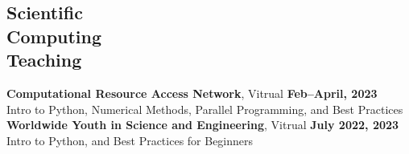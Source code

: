 \documentclass[margin,line]{resume}
\begin{document}
\begin{resume}

    \section{\mysidestyle Scientific\\Computing\\Teaching}
    \textbf{Computational Resource Access Network}, Vitrual \hfill \textbf{Feb--April, 2023}\\
    Intro to Python, Numerical Methods, Parallel Programming, and Best Practices \\
    \textbf{Worldwide Youth in Science and Engineering}, Vitrual \hfill \textbf{July 2022, 2023}\\
    Intro to Python, and Best Practices for Beginners
                \vspace{2mm}\\



\end{resume}
\end{document}
